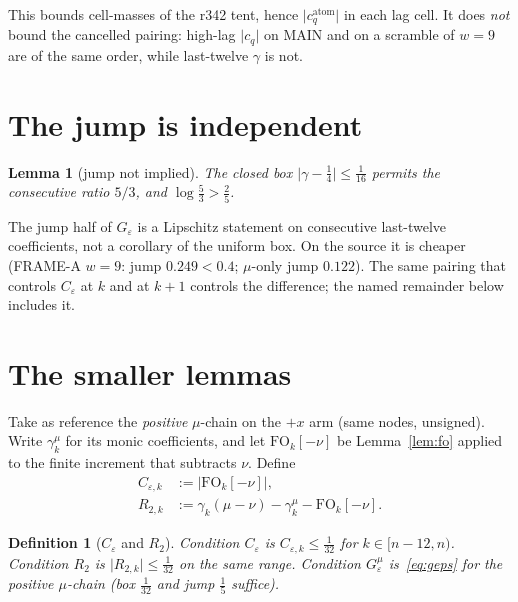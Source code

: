 \documentclass[11pt]{article}
\newtheorem{lemma}{Lemma}
\newtheorem{definition}{Definition}
\theoremstyle{remark}
\begin{document}
This bounds cell-masses of the r342 tent, hence $\lvert c_q^{\mathrm{atom}}\rvert$
in each lag cell.  It does \emph{not} bound the cancelled pairing:
high-lag $\lvert c_q\rvert$ on MAIN and on a scramble of $w=9$ are
of the same order, while last-twelve $\gamma$ is not.

\section{The jump is independent}\label{sec:jump}

\begin{lemma}[jump not implied]\label{lem:jumpind}
The closed box $\lvert\gamma-\tfrac14\rvert\le\tfrac1{16}$ permits
the consecutive ratio $5/3$, and $\log\tfrac53>\tfrac25$.
\end{lemma}

The jump half of $G_\varepsilon$ is a Lipschitz statement on
consecutive last-twelve coefficients, not a corollary of the
uniform box.  On the source it is cheaper (FRAME-A $w=9$: jump
$0.249<0.4$; $\mu$-only jump $0.122$).  The same pairing that
controls $C_\varepsilon$ at $k$ and at $k+1$ controls the
difference; the named remainder below includes it.

\section{The smaller lemmas}\label{sec:red}

Take as reference the \emph{positive} $\mu$-chain on the $+x$ arm
(same nodes, unsigned).  Write $\gamma_k^\mu$ for its monic
coefficients, and let $\mathrm{FO}_k[-\nu]$ be Lemma~\ref{lem:fo}
applied to the finite increment that subtracts $\nu$.
Define
\begin{align}
C_{\varepsilon,k}
&:=
\bigl\lvert\mathrm{FO}_k[-\nu]\bigr\rvert,
\label{eq:ceps}
\\
R_{2,k}
&:=
\gamma_k(\mu-\nu)-\gamma_k^\mu-\mathrm{FO}_k[-\nu].
\label{eq:r2}
\end{align}

\begin{definition}[$C_\varepsilon$ and $R_2$]\label{def:pair}
Condition $C_\varepsilon$ is $C_{\varepsilon,k}\le\tfrac1{32}$
for $k\in[n-12,n)$.
Condition $R_2$ is $\lvert R_{2,k}\rvert\le\tfrac1{32}$ on the
same range.
Condition $G_\varepsilon^\mu$ is~\eqref{eq:geps} for the positive
$\mu$-chain (box $\tfrac1{32}$ and jump $\tfrac15$ suffice).
\end{definition}
\end{document}
